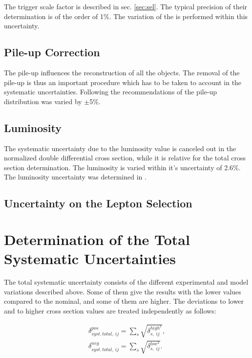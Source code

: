 The trigger scale factor is described in sec. \ref{sec:sel}. The typical precision of their determination is of the order
of 1\%. The variation of the  is performed within this uncertainty.

\subsection{Pile-up Correction}

The pile-up influences the reconstruction of all the objects. The removal of the pile-up is thus an important procedure
which has to be taken to account in the systematic uncertainties. Following the recommendations of \cite{TWikiSystPU} the
pile-up distribution was varied by $\pm$5\%.

\subsection{Luminosity}

The systematic uncertainty due to the luminosity value is canceled out in the normalized double differential cross section,
while it is relative for the total cross section determination. The luminosity is varied within it's uncertainty of 2.6\%. 
The luminosity uncertainty was determined in \cite{CMS-PAS-LUM-13-001}.

\subsection{Uncertainty on the Lepton Selection}
\section{Determination of the Total Systematic Uncertainties}

The total systematic uncertainty consists of the different experimental and model variations described above.
Some of them give the results with the lower values compared to the nominal, and some of them are higher.
The deviations to lower and to higher cross section values are treated independently as follows:

\begin{align}
 \delta_{syst.\,total,\:ij}^{pos} = \sum_{s}\sqrt{\delta_{s,\;ij}^{high^{2}}}, \\
 \delta_{syst.\,total,\:ij}^{neg} = \sum_{s} \sqrt{\delta_{s,\;ij}^{low^{2}}}.
\end{align}

